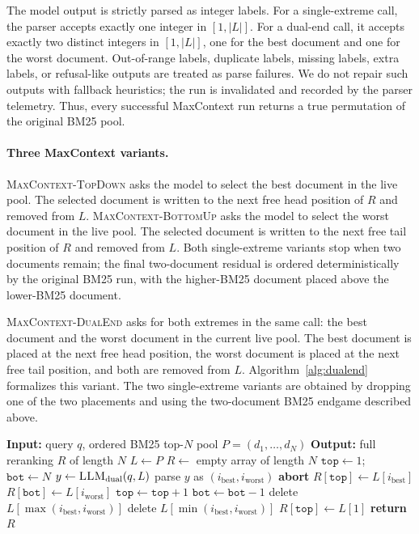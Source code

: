 The model output is strictly parsed as integer labels. For a
single-extreme call, the parser accepts exactly one integer in
$[1,|L|]$. For a dual-end call, it accepts exactly two distinct integers
in $[1,|L|]$, one for the best document and one for the worst document.
Out-of-range labels, duplicate labels, missing labels, extra labels, or
refusal-like outputs are treated as parse failures. We do not repair such
outputs with fallback heuristics; the run is invalidated and recorded by
the parser telemetry. Thus, every successful MaxContext run returns a
true permutation of the original BM25 pool.

\paragraph{Three MaxContext variants.}
\textsc{MaxContext-TopDown} asks the model to select the best document in
the live pool. The selected document is written to the next free head
position of $R$ and removed from $L$. \textsc{MaxContext-BottomUp} asks
the model to select the worst document in the live pool. The selected
document is written to the next free tail position of $R$ and removed
from $L$. Both single-extreme variants stop when two documents remain;
the final two-document residual is ordered deterministically by the
original BM25 run, with the higher-BM25 document placed above the
lower-BM25 document.

\textsc{MaxContext-DualEnd} asks for both extremes in the same call: the
best document and the worst document in the current live pool. The best
document is placed at the next free head position, the worst document is
placed at the next free tail position, and both are removed from $L$.
Algorithm~\ref{alg:dualend} formalizes this variant. The two
single-extreme variants are obtained by dropping one of the two
placements and using the two-document BM25 endgame described above.

\begin{algorithm}[t]
\small
\caption{\textsc{MaxContext-DualEnd}}
\label{alg:dualend}
\begin{algorithmic}[1]
\State \textbf{Input:} query $q$, ordered BM25 top-$N$ pool $P=(d_1,\ldots,d_N)$
\State \textbf{Output:} full reranking $R$ of length $N$
\State $L \gets P$
\State $R \gets$ empty array of length $N$
\State $\texttt{top} \gets 1$; \ $\texttt{bot} \gets N$
  \State $y \gets \textsc{LLM}_{\mathrm{dual}}(q,L)$
  \State parse $y$ as $(i_{\mathrm{best}}, i_{\mathrm{worst}})$
    \State \textbf{abort}
  \EndIf
  \State $R[\texttt{top}] \gets L[i_{\mathrm{best}}]$
  \State $R[\texttt{bot}] \gets L[i_{\mathrm{worst}}]$
  \State $\texttt{top} \gets \texttt{top}+1$
  \State $\texttt{bot} \gets \texttt{bot}-1$
  \State delete $L[\max(i_{\mathrm{best}}, i_{\mathrm{worst}})]$
  \State delete $L[\min(i_{\mathrm{best}}, i_{\mathrm{worst}})]$
\EndWhile
{}
  \State $R[\texttt{top}] \gets L[1]$
\EndIf
\State \textbf{return} $R$
\end{algorithmic}
\end{algorithm}

